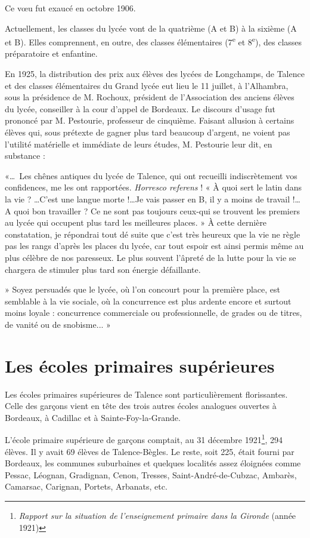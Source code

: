\documentclass[a4paper,11pt]{book}
\begin{document}
Ce vœu fut exaucé en octobre 1906.

Actuellement, les classes du lycée vont de la quatrième (A et B) à la sixième (A et B). Elles comprennent, en outre, des classes élémentaires (7\textsuperscript{e} et 8\textsuperscript{e}), des classes préparatoire et enfantine.

En 1925, la distribution des prix aux élèves des lycées de Longchamps, de Talence et des classes élémentaires du Grand lycée eut lieu le 11 juillet, à l'Alhambra, sous la présidence de M. Rochoux, président de l'Association des anciens élèves du lycée, conseiller à la cour d'appel de Bordeaux. Le discours d'usage fut prononcé par M. Pestourie, professeur de cinquième. Faisant allusion à certains élèves qui, sous prétexte de gagner plus tard beaucoup d'argent, ne voient pas l'utilité matérielle et immédiate de leurs études, M. Pestourie leur dit, en substance :

«\dots~Les chênes antiques du lycée de Talence, qui ont recueilli indiscrètement vos confidences, me les ont rapportées. \textit{Horresco referens} ! « À quoi sert le latin dans la vie ? \dots C'est une langue morte !\dots Je vais passer en B, il y a moins de travail !\dots A quoi bon travailler ? Ce ne sont pas toujours ceux-qui se trouvent les premiers au lycée qui occupent plus tard les meilleures places. » À cette dernière constatation, je répondrai tout dé suite que c'est très heureux que la vie ne règle pas les rangs d'après les places du lycée, car tout espoir est ainsi permis même au
plus célèbre de nos paresseux. Le plus souvent l'âpreté de la lutte pour la vie se chargera de stimuler plus tard son énergie défaillante.

» Soyez persuadés que le lycée, où l'on concourt pour la première place, est semblable à la vie sociale, où la concurrence est plus ardente encore et surtout moins loyale : concurrence commerciale ou professionnelle, de grades ou de titres, de vanité ou de snobisme... »

\section{Les écoles primaires supérieures}

Les écoles primaires supérieures de Talence sont particulièrement florissantes. Celle des garçons vient en tête des trois autres écoles analogues ouvertes à Bordeaux, à
Cadillac et à Sainte-Foy-la-Grande.

L'école primaire supérieure de garçons comptait, au
31 décembre 1921\footnote{\textit{Rapport sur la situation de l'enseignement primaire dans la Gironde} (année 1921)}, 294 élèves. Il y avait 69 élèves de Talence-Bègles. Le reste, soit 225, était fourni par Bordeaux, les communes suburbaines et quelques localités assez éloignées comme Pessac, Léognan, Gradignan, Cenon, Tresses, Saint-André-de-Cubzac, Ambarès, Camarsac, Carignan, Portets, Arbanats, etc.
\end{document}

